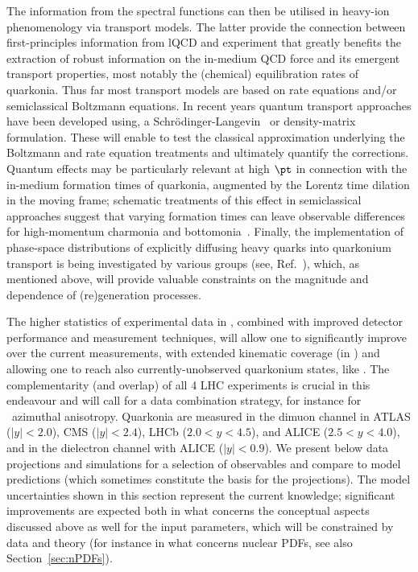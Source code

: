 \documentclass[../report.tex]{subfiles}
\begin{document}
The information from the spectral functions can then be utilised in heavy-ion phenomenology via transport models. The latter provide the connection between first-principles information from lQCD and experiment that greatly benefits the extraction of robust information on the in-medium QCD force and its emergent transport properties, most notably the (chemical) equilibration rates of quarkonia. 
Thus far most transport models are based on rate equations and/or semiclassical Boltzmann equations. In recent years quantum transport approaches have been developed using, \eg a Schr\"odinger-Langevin~\cite{Blaizot:2015hya,Katz:2015qja,Kajimoto:2017rel} or density-matrix~\cite{Akamatsu:2014qsa,Brambilla:2016wgg} formulation. These will enable to test the classical approximation underlying the Boltzmann and rate equation treatments and ultimately quantify the corrections.  Quantum effects may be particularly relevant at high $\pt$ in connection with the in-medium formation times of quarkonia, augmented by the Lorentz time dilation in the moving frame; schematic treatments of this effect in semiclassical approaches suggest that varying formation times can leave observable differences for high-momentum charmonia and bottomonia~\cite{Song:2015bja,Hoelck:2016tqf,Du:2017qkv,Aronson:2017ymv,Krouppa:2017jlg}. 
Finally, the implementation of phase-space distributions of explicitly diffusing heavy quarks into quarkonium transport is being investigated by various groups (see, \eg Ref.~\cite{Yao:2017fuc}), which, as mentioned above, will provide valuable constraints on the magnitude and \pt dependence of (re)generation processes.     


The higher statistics of experimental data in \RunsThreeFour, combined with improved detector performance and measurement techniques, will allow one to significantly improve over the current measurements, with extended kinematic coverage (in \pT) and allowing one to reach also currently-unobserved quarkonium states, like 
.
The complementarity (and overlap) of all 4 LHC experiments is crucial in this endeavour and will call for a data combination strategy, for instance for \PGU\ azimuthal anisotropy.
Quarkonia are measured in the dimuon channel in ATLAS ($|y|<2.0$), CMS ($|y|<2.4$), LHCb ($2.0<y<4.5$), and ALICE ($2.5<y<4.0$), and in the dielectron channel with ALICE ($|y|<0.9$).
We present below data projections and simulations for a selection of observables and compare to model predictions (which sometimes constitute the basis for the projections). The model uncertainties shown in this section represent the current knowledge; significant improvements are expected both in what concerns the conceptual aspects discussed above as well for the input parameters, which will be constrained by data and theory (for instance in what concerns nuclear PDFs, see also Section~\ref{sec:nPDFs}).
\end{document}

